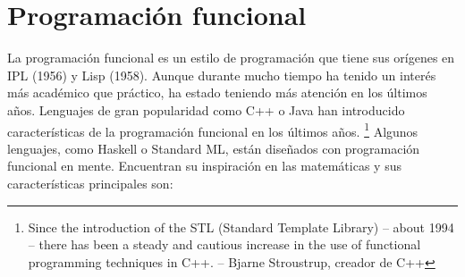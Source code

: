 \documentclass[12pt, twoside]{book}
\begin{document}
\section{Programación funcional}
La programación funcional es un estilo de programación que tiene sus orígenes en IPL (1956) y Lisp (1958).
Aunque durante mucho tiempo ha tenido un interés más académico que práctico, ha estado teniendo más atención en los últimos años.
Lenguajes de gran popularidad como C++ o Java han introducido características de la programación funcional en los últimos años.
\footnote{Since the introduction of the STL (Standard Template Library) -- about 1994 -- there has been a steady and cautious increase in the use of functional programming techniques in C++. -- Bjarne Stroustrup, creador de C++}
Algunos lenguajes, como Haskell o Standard ML, están diseñados con programación funcional en mente.
Encuentran su inspiración en las matemáticas y sus características principales son:
\end{document}
